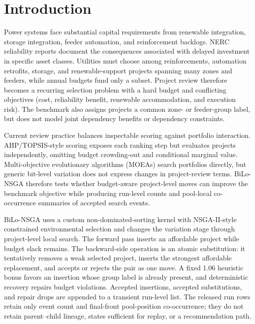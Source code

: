 \documentclass[applsci,article,submit,moreauthors]{Definitions/mdpi}
\begin{document}
\section{Introduction}\label{introduction}

Power systems face substantial capital requirements from renewable integration, storage integration, feeder automation, and reinforcement backlogs. NERC reliability reports document the consequences associated with delayed investment in specific asset classes. Utilities must choose among reinforcements, automation retrofits, storage, and renewable-support projects spanning many zones and feeders, while annual budgets fund only a subset. Project review therefore becomes a recurring selection problem with a hard budget and conflicting objectives (cost, reliability benefit, renewable accommodation, and execution risk). The benchmark also assigns projects a common zone- or feeder-group label, but does not model joint dependency benefits or dependency constraints.

Current review practice balances inspectable scoring against portfolio interaction. AHP/TOPSIS-style scoring exposes each ranking step but evaluates projects independently, omitting budget crowding-out and conditional marginal value. Multi-objective evolutionary algorithms (MOEAs) search portfolios directly, but generic bit-level variation does not express changes in project-review terms. BiLo-NSGA therefore tests whether budget-aware project-level moves can improve the benchmark objective while producing run-level counts and pool-local co-occurrence summaries of accepted search events.

BiLo-NSGA uses a custom non-dominated-sorting kernel with NSGA-II-style constrained environmental selection and changes the variation stage through project-level local search. The forward pass inserts an affordable project while budget slack remains. The backward-side operation is an atomic substitution: it tentatively removes a weak selected project, inserts the strongest affordable replacement, and accepts or rejects the pair as one move. A fixed 1.06 heuristic bonus favors an insertion whose group label is already present, and deterministic recovery repairs budget violations. Accepted insertions, accepted substitutions, and repair drops are appended to a transient run-level list. The released run rows retain only event count and final-front pool-position co-occurrence; they do not retain parent--child lineage, states sufficient for replay, or a recommendation path.
\end{document}

